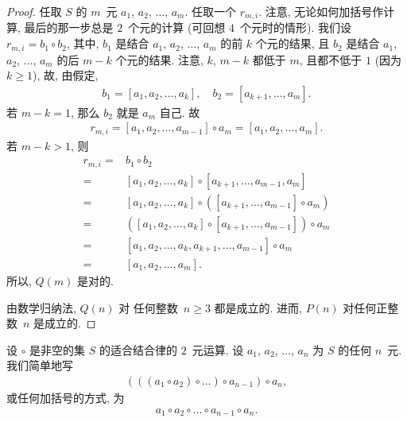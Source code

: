 \documentclass[../libro.tex]{subfiles}
\begin{document}
\begin{proof}
    任取 \(S\) 的 \(m\)~元
    \(a_1\), \(a_2\), \(\dots\), \(a_m\).
    任取一个 \(r_{m,i}\).
    注意, 无论如何加括号作计算,
    最后的那一步总是 \(2\)~个元的计算
    (可回想 \(4\)~个元时的情形).
    我们设 \(r_{m,i} = b_1 \circ b_2\),
    其中, \(b_1\) 是结合 \(a_1\), \(a_2\), \(\dots\), \(a_m\)
    的前 \(k\) 个元的结果,
    且 \(b_2\) 是结合 \(a_1\), \(a_2\), \(\dots\), \(a_m\)
    的后 \(m-k\) 个元的结果.
    注意, \(k\), \(m-k\) 都低于 \(m\),
    且都不低于 \(1\)
    (因为 \(k \geq 1\)),
    故, 由假定,
    \begin{align*}
        b_1 = [a_1, a_2, \dots, a_k],
        \quad
        b_2 = [a_{k+1}, \dots, a_m].
    \end{align*}
    若 \(m - k = 1\), 那么 \(b_2\) 就是 \(a_m\) 自己.
    故
    \begin{align*}
        r_{m,i}
        = [a_1, a_2, \dots, a_{m-1}] \circ a_m
        = [a_1, a_2, \dots, a_m].
    \end{align*}
    若 \(m - k > 1\), 则
    \begin{align*}
        r_{m,i}
        = {} &
        b_1 \circ b_2
        \\
        = {} &
        [a_1, a_2, \dots, a_k] \circ
        [a_{k+1}, \dots, a_{m-1}, a_m]
        \\
        = {} &
        [a_1, a_2, \dots, a_k] \circ
        ([a_{k+1}, \dots, a_{m-1}] \circ a_m)
        \\
        = {} &
        ([a_1, a_2, \dots, a_k] \circ
        [a_{k+1}, \dots, a_{m-1}]) \circ a_m
        \\
        = {} &
        [a_1, a_2, \dots, a_k, a_{k+1}, \dots, a_{m-1}]
        \circ a_m
        \\
        = {} &
        [a_1, a_2, \dots, a_m].
    \end{align*}
    所以, \(Q(m)\) 是对的.

    由数学归纳法, \(Q(n)\) 对%
    任何整数~\(n \geq 3\) 都是成立的.
    进而, \(P(n)\) 对任何正整数~\(n\) 是成立的.
\end{proof}

设 \(\circ\) 是非空的集 \(S\) 的适合结合律的 \(2\)~元运算.
设 \(a_1\), \(a_2\), \(\dots\), \(a_n\) 为 \(S\) 的任何 \(n\)~元.
我们简单地写
\begin{align*}
    (((a_1 \circ a_2) \circ \dots) \circ a_{n-1}) \circ a_n,
\end{align*}
或任何加括号的方式, 为
\begin{align*}
    a_1 \circ a_2 \circ \dots \circ a_{n-1} \circ a_n.
\end{align*}
\end{document}
